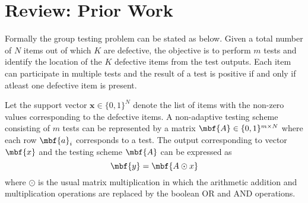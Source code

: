 \documentclass[conference,twocolumn]{IEEEtran}
\begin{document}

\section{Review: Prior Work}
\label{Sec:PriorWork}
Formally the group testing problem can be stated as below. Given a total number of $N$ items out of which $K$ are defective, the objective is to perform $m$ tests and identify the location of the $K$ defective items from the test outputs. Each item can participate in multiple tests and the result of a test is positive if and only if atleast one defective item is present.


Let the support vector $\mathbf{x}\in\{0,1\}^{N}$ denote the list of items with the non-zero values corresponding to the defective items. A non-adaptive testing scheme consisting of $m$ tests can be represented by a matrix $\mbf{A}\in\{0,1\}^{m\times N}$ where each row $\mbf{a}_{i}$ corresponds to a test. 
The output corresponding to vector $\mbf{x}$ and the testing scheme $\mbf{A}$ can be expressed as
\begin{equation*}
\mbf{y}=\mbf{A\odot x}
\end{equation*}
where $\odot$ is the usual matrix multiplication in which the arithmetic addition and multiplication operations are replaced by the boolean OR and AND operations.
\end{document}

